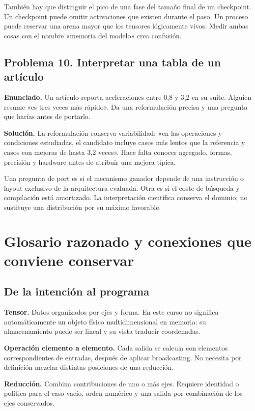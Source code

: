 \documentclass[12pt,a4paper,oneside]{report}
\begin{document}
También hay que distinguir el pico de una fase del tamaño final de un checkpoint. Un checkpoint puede omitir activaciones que existen durante el paso. Un proceso puede reservar una arena mayor que los tensores lógicamente vivos. Medir ambas cosas con el nombre «memoria del modelo» crea confusión.

\section{Problema 10. Interpretar una tabla de un artículo}
\textbf{Enunciado.} Un artículo reporta aceleraciones entre 0,8 y 3,2 en su suite. Alguien resume «es tres veces más rápido». Da una reformulación precisa y una pregunta que harías antes de portarlo.

\textbf{Solución.} La reformulación conserva variabilidad: «en las operaciones y condiciones estudiadas, el candidato incluye casos más lentos que la referencia y casos con mejoras de hasta 3,2 veces». Hace falta conocer agregado, formas, precisión y hardware antes de atribuir una mejora típica.

Una pregunta de port es si el mecanismo ganador depende de una instrucción o layout exclusivo de la arquitectura evaluada. Otra es si el coste de búsqueda y compilación está amortizado. La interpretación científica conserva el dominio; no sustituye una distribución por su máximo favorable.

\chapter{Glosario razonado y conexiones que conviene conservar}
\label{ch:glosario}
\section{De la intención al programa}
\textbf{Tensor.} Datos organizados por ejes y forma. En este curso no significa automáticamente un objeto físico multidimensional en memoria: su almacenamiento puede ser lineal y su vista traducir coordenadas.

\textbf{Operación elemento a elemento.} Cada salida se calcula con elementos correspondientes de entradas, después de aplicar broadcasting. No necesita por definición mezclar distintas posiciones de una reducción.

\textbf{Reducción.} Combina contribuciones de uno o más ejes. Requiere identidad o política para el caso vacío, orden numérico y una salida por combinación de los ejes conservados.
\end{document}
